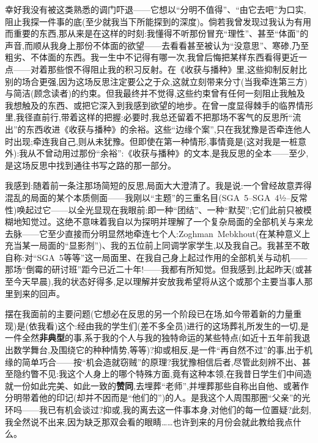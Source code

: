 \dmark{}幸好我没有被这类熟悉的调门吓退——它想以“分明不值得”、“由它去吧”为口实,阻止我探一件事的底(至少就我当下所能探到的深度)。倘若我曾发现过我认为有用而重要的东西,那从来是在这样的时刻:我懂得不听那份冒充“理性”、甚至“体面”的声音,而顺从我身上那份不体面的欲望——去看看甚至被认为“没意思”、寒碜,乃至粗劣、不体面的东西。我一生中不记得有哪一次,我曾后悔把某样东西看得更近一点——对着那些恨不得阻止我的积习反射。在《收获与播种》里,这些抑制反射比别的场合更强,因为这场反思注定要公之于众,这就立刻带来分寸(当我牵连第三方)与简洁(顾念读者)的约束。但我最终并不觉得,这些约束曾有任何一刻阻止我触及我想触及的东西、或把它深入到我感到欲望的地步。在曾一度显得棘手的临界情形里,我径直前行,带着这样的把握:必要时,我总还留着不把那场不客气的反思所“流出”的东西收进《收获与播种》的余裕。这些“边缘个案”,只在我犹豫是否牵连他人时出现;牵连我自己,则从未犹豫。但即使在第一种情形,事情竟是(这对我是一桩意外):我从不曾动用过那份“余裕”:《收获与播种》的文本,是我反思的全本——至少,是这场反思中找到通往书写之路的那一部分。

我感到:随着前一条注那场简短的反思,局面大大澄清了。我是说:一个曾经故意弄得混乱的局面的某个本质侧面——我刚以“主题”的三重名目(SGA~5--SGA~4½--反常性)唤起过它——以全光显现在我眼前:即一种“团结”、一种“默契”;它们此前只被模糊地知觉过。这绝不意味着我自以为探明并理解了一个复杂局面的全部机关与来龙去脉——它至少直接而分明显然地牵连七个人:Zoghman~Mebkhout(在某种意义上充当某一局面的“显影剂”)、我的五位前上同调学家学生\dmark{},以及我自己。我甚至不敢自称:对“SGA~5等等”这一局面里、在我自己身上起过作用的全部机关与动机——那场“倒霉的研讨班”距今已近二十年!——我都有所知觉。但我感到,比起昨天(或甚至今天早晨),我的状态好得多,足以理解并安放我希望将从这个或那个主要当事人那里到来的回声。

摆在我面前的主要问题(它想必在反思的另一个阶段已在场,如今带着新的力量重现)是(依我看)这个:经由我的学生们(差不多全员)进行的这场葬礼所发生的一切,是一件全然\textbf{非典型}的事,系于我的个人与我的独特命运的某些特点(如近十五年前我退出数学舞台,及围绕它的种种情势,等等)?抑或相反,是一件“再自然不过”的事,出于机缘的简单巧合——按“机会造就窃贼”的原理?我犹豫相信后者,尽管此刻辨不出、甚至隐约瞥不见:我这个人身上的哪个特殊方面,竟有这种本领,在我昔日学生们中间造就一份如此完美、如此一致的\textbf{赞同},去埋葬“老师”,并埋葬那些自称出自他、或著作分明带着他的印记(却并不因而是“他们的”)的人。是我这个人周围那圈“父亲”的光环吗——我已有机会谈过?抑或,我的离去这一件事本身,对他们的每一位置疑?此刻,我全然说不出来,因为缺乏那双会看的眼睛……也许到来的月份会就此教给我点什么。


